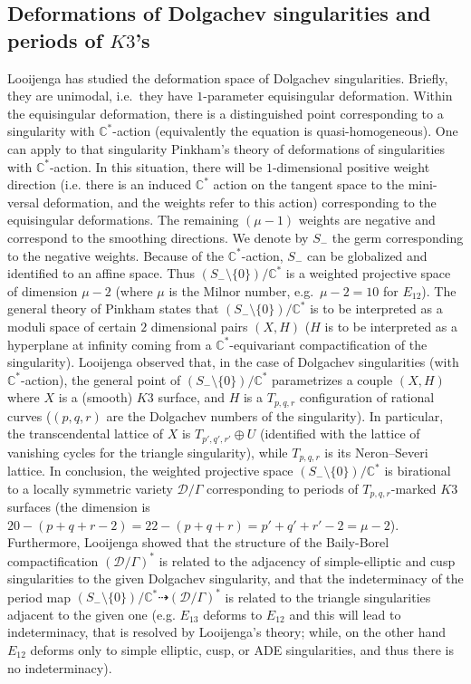 \documentclass[11pt]{amsart}
\numberwithin{equation}{section}
\theoremstyle{plain}
\theoremstyle{remark}
\theoremstyle{definition}
\newcommand{\bC}{\mathbb{C}}
\newcommand{\sD}{\mathscr{D}}
\newcommand{\CC}{{\mathbb C}}
\begin{document}
\subsection{Deformations of Dolgachev singularities and periods of $K3$'s}
%
 Looijenga \cite{ltriangle1,ltriangle2} has studied the deformation space of Dolgachev singularities. Briefly, they  are unimodal, i.e.~they have $1$-parameter equisingular deformation. Within the equisingular deformation, there is a distinguished point corresponding to a singularity with $\bC^*$-action (equivalently the equation is quasi-homogeneous).  One can apply to that singularity Pinkham's theory of deformations of singularities with $\bC^*$-action. In this situation, there will be $1$-dimensional positive weight direction (i.e. there is an induced $\bC^*$ action on the tangent space to the mini-versal deformation, and the weights refer to this action) corresponding to the equisingular deformations. The remaining $(\mu-1)$ weights are negative and correspond to the smoothing directions. We denote by $S_{-}$ the germ corresponding to the negative weights. Because of the $\bC^*$-action, $S_{-}$ can be globalized and identified to an affine space. Thus $(S_{-}\setminus \{0\})/\bC^*$ is a weighted projective space of dimension $\mu-2$ (where $\mu$ is the Milnor number, e.g.~$\mu-2=10$ for $E_{12}$). The general theory of Pinkham states  that $(S_{-}\setminus \{0\})/\bC^*$ is to be interpreted as a moduli space of certain $2$ dimensional pairs $(X,H)$ ($H$ is to be interpreted as a hyperplane at infinity coming from a $\bC^*$-equivariant compactification of the singularity).
 Looijenga \cite{ltriangle1,ltriangle2} observed  that, in the case of Dolgachev singularities (with $\CC^{*}$-action),  the general point of  $(S_{-}\setminus \{0\})/\bC^*$ 
 parametrizes a couple $(X,H)$ where  $X$ is a (smooth) $K3$ surface, and $H$ is a $T_{p,q,r}$ configuration of rational curves ($(p,q,r)$ are the Dolgachev numbers of the singularity). In particular, the transcendental lattice of $X$ is $T_{p',q',r'}\oplus U$ (identified with the lattice of vanishing cycles for the triangle singularity), while $T_{p,q,r}$ is its Neron--Severi lattice. In conclusion, the weighted projective space  $(S_{-}\setminus \{0\})/\bC^*$ is birational to a locally symmetric variety $\sD/\Gamma$ corresponding to periods of $T_{p,q,r}$-marked $K3$ surfaces (the dimension is $20-(p+q+r-2)=22-(p+q+r)=p'+q'+r'-2=\mu-2$). Furthermore,  Looijenga \cite{ltriangle2} showed that the  structure of the Baily-Borel compactification $(\sD/\Gamma)^*$ is related to the adjacency of simple-elliptic and cusp singularities to the given Dolgachev singularity, and that the indeterminacy of the period map $(S_{-}\setminus \{0\})/\bC^*\dashrightarrow (\sD/\Gamma)^*$ is related to the triangle singularities adjacent to the given one (e.g. $E_{13}$ deforms to $E_{12}$ and this will lead to indeterminacy, that is resolved by Looijenga's theory; while, on the other hand $E_{12}$ deforms only to simple elliptic, cusp, or ADE singularities, and thus there is no indeterminacy).
 
\end{document}
